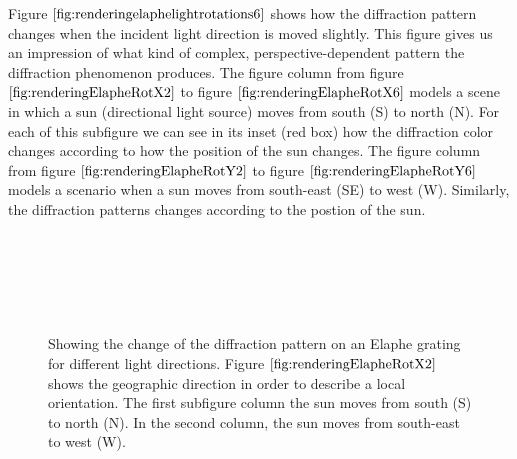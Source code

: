 Figure $\ref{fig:renderingelaphelightrotations6}$ shows how the diffraction pattern changes when the incident light direction is moved slightly. This figure gives us an impression of what kind of complex, perspective-dependent pattern the diffraction phenomenon produces. The figure column from figure $\ref{fig:renderingElapheRotX2}$ to figure $\ref{fig:renderingElapheRotX6}$ models a scene in which a sun (directional light source) moves from south (S) to north (N). For each of this subfigure we can see in its inset (red box) how the diffraction color changes according to how the position of the sun changes. The figure column from figure $\ref{fig:renderingElapheRotY2}$ to figure $\ref{fig:renderingElapheRotY6}$ models a scenario when a sun moves from south-east (SE) to west (W). Similarly, the diffraction patterns changes according to the postion of the sun.

\begin{figure}[H]
  \centering
  ~

  ~
 
  ~
  
\caption[Snake Renderings: FLSS Approach for varying Light Directions]{Showing the change of the diffraction pattern on an Elaphe grating for different light directions. Figure $\ref{fig:renderingElapheRotX2}$ shows the geographic direction in order to describe a local orientation. The first subfigure column the sun moves from south (S) to north (N). In the second column, the sun moves from south-east to west (W).}
\label{fig:renderingelaphelightrotations6}
\end{figure}

